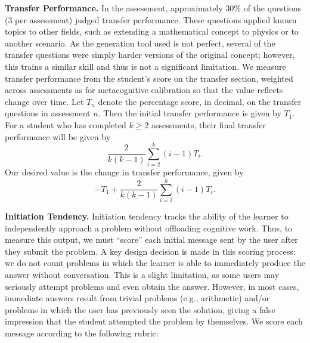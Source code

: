 \documentclass[12pt]{article}
\begin{document}
\noindent \textbf{Transfer Performance.} In the assessment, approximately $30\%$ of the questions ($3$ per assessment) judged transfer performance. These questions applied known topics to other fields, such as extending a mathematical concept to physics or to another scenario. As the generation tool used is not perfect, several of the transfer questions were simply harder versions of the original concept; however, this trains a similar skill and thus is not a significant limitation. We measure transfer performance from the student's score on the transfer section, weighted across assessments as for metacognitive calibration so that the value reflects change over time. Let $T_n$ denote the percentage score, in decimal, on the transfer questions in assessment $n$. Then the initial transfer performance is given by $T_1$. For a student who has completed $k\ge 2$ assessments, their final transfer performance will be given by
\[\frac{2}{k(k-1)} \sum_{i=2}^{k} (i-1)T_i.\] Our desired value is the change in transfer performance, given by
\[-T_1 + \frac{2}{k(k-1)} \sum_{i=2}^{k} (i-1)T_i.\]

\noindent \textbf{Initiation Tendency.} Initiation tendency tracks the ability of the learner to independently approach a problem without offloading cognitive work. Thus, to measure this output, we must ``score'' each initial message sent by the user after they submit the problem. A key design decision is made in this scoring process: we do not count problems in which the learner is able to immediately produce the answer without conversation. This is a slight limitation, as some users may seriously attempt problems and even obtain the answer. However, in most cases, immediate answers result from trivial problems (e.g., arithmetic) and/or problems in which the user has previously seen the solution, giving a false impression that the student attempted the problem by themselves. We score each message according to the following rubric:
\end{document}

